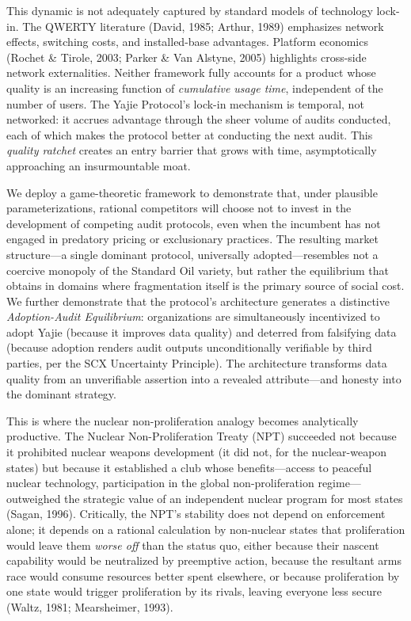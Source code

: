 \documentclass[12pt,a4paper]{article}
\theoremstyle{definition}
\theoremstyle{remark}
\begin{document}
This dynamic is not adequately captured by standard models of technology lock-in. The QWERTY literature (David, 1985; Arthur, 1989) emphasizes network effects, switching costs, and installed-base advantages. Platform economics (Rochet \& Tirole, 2003; Parker \& Van Alstyne, 2005) highlights cross-side network externalities. Neither framework fully accounts for a product whose quality is an increasing function of \textit{cumulative usage time}, independent of the number of users. The Yajie Protocol's lock-in mechanism is temporal, not networked: it accrues advantage through the sheer volume of audits conducted, each of which makes the protocol better at conducting the next audit. This \textit{quality ratchet} creates an entry barrier that grows with time, asymptotically approaching an insurmountable moat.

We deploy a game-theoretic framework to demonstrate that, under plausible parameterizations, rational competitors will choose not to invest in the development of competing audit protocols, even when the incumbent has not engaged in predatory pricing or exclusionary practices. The resulting market structure—a single dominant protocol, universally adopted—resembles not a coercive monopoly of the Standard Oil variety, but rather the equilibrium that obtains in domains where fragmentation itself is the primary source of social cost. We further demonstrate that the protocol's architecture generates a distinctive \textit{Adoption-Audit Equilibrium}: organizations are simultaneously incentivized to adopt Yajie (because it improves data quality) and deterred from falsifying data (because adoption renders audit outputs unconditionally verifiable by third parties, per the SCX Uncertainty Principle). The architecture transforms data quality from an unverifiable assertion into a revealed attribute—and honesty into the dominant strategy.

This is where the nuclear non-proliferation analogy becomes analytically productive. The Nuclear Non-Proliferation Treaty (NPT) succeeded not because it prohibited nuclear weapons development (it did not, for the nuclear-weapon states) but because it established a club whose benefits—access to peaceful nuclear technology, participation in the global non-proliferation regime—outweighed the strategic value of an independent nuclear program for most states (Sagan, 1996). Critically, the NPT's stability does not depend on enforcement alone; it depends on a rational calculation by non-nuclear states that proliferation would leave them \textit{worse off} than the status quo, either because their nascent capability would be neutralized by preemptive action, because the resultant arms race would consume resources better spent elsewhere, or because proliferation by one state would trigger proliferation by its rivals, leaving everyone less secure (Waltz, 1981; Mearsheimer, 1993).
\end{document}
